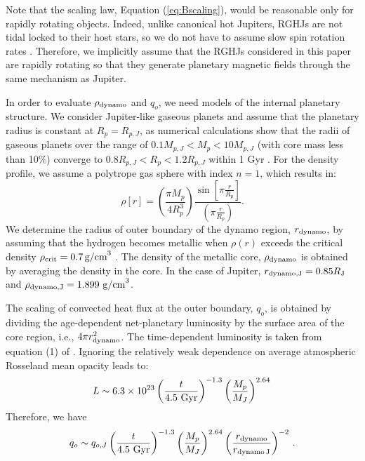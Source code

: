 \documentclass[iop,numberedappendix,apj]{emulateapj}
\begin{document}
Note that the scaling law, Equation (\ref{eq:Bscaling}), would be reasonable only for rapidly rotating objects.
Indeed, unlike canonical hot Jupiters, RGHJs are not tidal locked to their host stars, so we do not have to assume slow spin rotation rates \citep{spiegel+madhusudhan2012}.
Therefore, we implicitly assume that the RGHJs considered in this paper are rapidly rotating so that they generate planetary magnetic fields through the same mechanism as Jupiter. 


In order to evaluate $\rho _{\rm dynamo}$ and $q_o$, we need models of the internal planetary structure. 
We consider Jupiter-like gaseous planets and assume that the planetary radius is constant at $R_p = R_{p,J}$, as numerical calculations show that the radii of gaseous planets over the range of $0.1 M_{p, J} < M_p < 10M_{p, J}$ (with core mass less than 10\%) converge to $0.8 R_{p, J} < R_p < 1.2R_{p, J}$ within 1 Gyr \citep{fortney2007}. 
For the density profile, we assume a polytrope gas sphere with index $n=1$, which results in:
\begin{equation}
\rho [r] = \left( \frac{\pi M_p}{4 R_p^3} \right) \frac{\sin \left[ \pi \frac{r}{R_p} \right]}{\left( \pi \frac{r}{R_p} \right)}. \label{eq:rho_r}
\end{equation}
We determine the radius of outer boundary of the dynamo region, $r_{\rm dynamo}$, by assuming that the hydrogen becomes metallic when $\rho (r)$ exceeds the critical density $\rho_{\rm crit}=0.7\,\mbox{g/cm}^3$ \citep{exoplanets2006, griesmeier2007b}.
The density of the metallic core, $\rho _{\rm dynamo}$ is obtained by averaging the density in the core. 
In the case of Jupiter, $r_{\rm dynamo, J} = 0.85 R_{\rm J}$ and $\rho_{\rm dynamo, J} = 1.899~{\rm g/cm}^3$.

The scaling of convected heat flux at the outer boundary, $q_o$, is obtained by dividing the age-dependent net-planetary luminosity by the surface area of the core region, i.e., $4\pi r_{\rm dynamo}^2$. 
The time-dependent luminosity is taken from equation (1) of \citet{burrows_et_al2001} \citep[see also][]{marley2007}. 
Ignoring the relatively weak dependence on average atmospheric Rosseland mean opacity leads to:
\begin{equation}
L \sim 6.3\times10^{23} \left( \frac{t}{4.5 \rm~Gyr} \right)^{-1.3} \left( \frac{M_p}{M_J} \right)^{2.64} \, 
\label{eq:burrowsLum}
\end{equation}
Therefore, we have
\begin{equation}
q_o \sim q_{o, J} \left( \frac{t}{4.5 \rm~Gyr} \right)^{-1.3} \left( \frac{M_p}{M_J} \right)^{2.64} \left( \frac{r_{\rm dynamo}}{r_{\rm dynamo\,J}} \right)^{-2}\, .
\label{eq:burrowsHeatFlux}
\end{equation}
\end{document}
